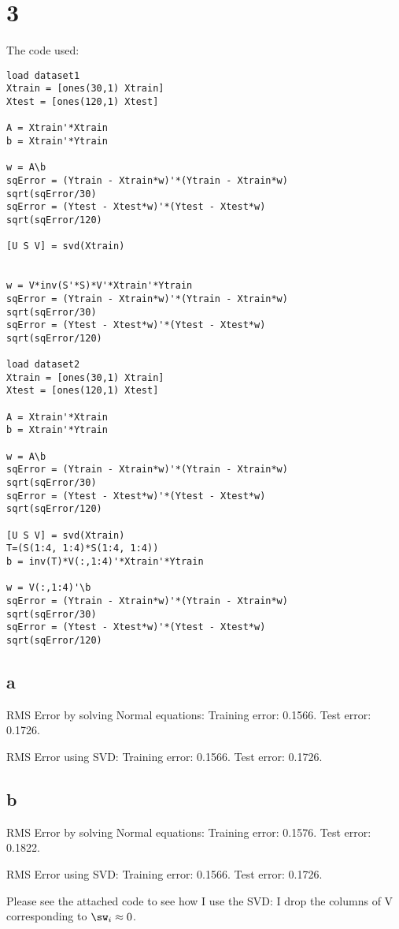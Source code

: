 \documentclass{article}
\begin{document}
\section{3}
The code used:
\begin{verbatim} 
load dataset1 
Xtrain = [ones(30,1) Xtrain]
Xtest = [ones(120,1) Xtest]

A = Xtrain'*Xtrain
b = Xtrain'*Ytrain

w = A\b
sqError = (Ytrain - Xtrain*w)'*(Ytrain - Xtrain*w)
sqrt(sqError/30)
sqError = (Ytest - Xtest*w)'*(Ytest - Xtest*w)
sqrt(sqError/120)

[U S V] = svd(Xtrain)


w = V*inv(S'*S)*V'*Xtrain'*Ytrain
sqError = (Ytrain - Xtrain*w)'*(Ytrain - Xtrain*w)
sqrt(sqError/30)
sqError = (Ytest - Xtest*w)'*(Ytest - Xtest*w)
sqrt(sqError/120)

load dataset2
Xtrain = [ones(30,1) Xtrain]
Xtest = [ones(120,1) Xtest]

A = Xtrain'*Xtrain
b = Xtrain'*Ytrain

w = A\b
sqError = (Ytrain - Xtrain*w)'*(Ytrain - Xtrain*w)
sqrt(sqError/30)
sqError = (Ytest - Xtest*w)'*(Ytest - Xtest*w)
sqrt(sqError/120)

[U S V] = svd(Xtrain)
T=(S(1:4, 1:4)*S(1:4, 1:4))
b = inv(T)*V(:,1:4)'*Xtrain'*Ytrain

w = V(:,1:4)'\b
sqError = (Ytrain - Xtrain*w)'*(Ytrain - Xtrain*w)
sqrt(sqError/30)
sqError = (Ytest - Xtest*w)'*(Ytest - Xtest*w)
sqrt(sqError/120)
\end{verbatim}

\subsection{a}
RMS Error by solving Normal equations: Training error: 0.1566. Test error: 0.1726.

RMS Error using SVD: Training error: 0.1566. Test error: 0.1726.

\subsection{b}
RMS Error by solving Normal equations: Training error: 0.1576. Test error: 0.1822.

RMS Error using SVD: Training error: 0.1566. Test error: 0.1726.

Please see the attached code to see how I use the SVD: I drop the columns of V corresponding to $\sw_{i} \approx 0$.
\end{document}
